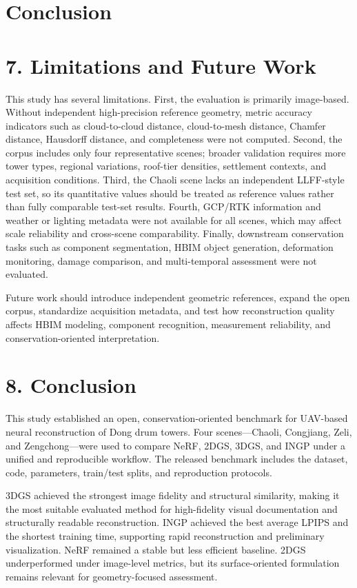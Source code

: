 \section{Conclusion}
\label{sec:conclusion}

\section{7. Limitations and Future
Work}\label{limitations-and-future-work}

This study has several limitations. First, the evaluation is primarily
image-based. Without independent high-precision reference geometry,
metric accuracy indicators such as cloud-to-cloud distance,
cloud-to-mesh distance, Chamfer distance, Hausdorff distance, and
completeness were not computed. Second, the corpus includes only four
representative scenes; broader validation requires more tower types,
regional variations, roof-tier densities, settlement contexts, and
acquisition conditions. Third, the Chaoli scene lacks an independent
LLFF-style test set, so its quantitative values should be treated as
reference values rather than fully comparable test-set results. Fourth,
GCP/RTK information and weather or lighting metadata were not available
for all scenes, which may affect scale reliability and cross-scene
comparability. Finally, downstream conservation tasks such as component
segmentation, HBIM object generation, deformation monitoring, damage
comparison, and multi-temporal assessment were not evaluated.

Future work should introduce independent geometric references, expand
the open corpus, standardize acquisition metadata, and test how
reconstruction quality affects HBIM modeling, component recognition,
measurement reliability, and conservation-oriented interpretation.

\section{8. Conclusion}\label{conclusion}

This study established an open, conservation-oriented benchmark for
UAV-based neural reconstruction of Dong drum towers. Four
scenes---Chaoli, Congjiang, Zeli, and Zengchong---were used to compare
NeRF, 2DGS, 3DGS, and INGP under a unified and reproducible workflow.
The released benchmark includes the dataset, code, parameters,
train/test splits, and reproduction protocols.

3DGS achieved the strongest image fidelity and structural similarity,
making it the most suitable evaluated method for high-fidelity visual
documentation and structurally readable reconstruction. INGP achieved
the best average LPIPS and the shortest training time, supporting rapid
reconstruction and preliminary visualization. NeRF remained a stable but
less efficient baseline. 2DGS underperformed under image-level metrics,
but its surface-oriented formulation remains relevant for
geometry-focused assessment.

